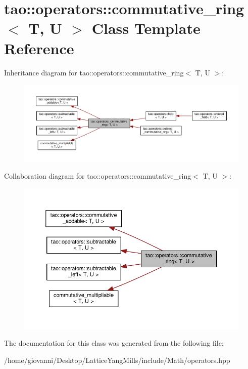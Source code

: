 \hypertarget{classtao_1_1operators_1_1commutative__ring}{}\section{tao\+:\+:operators\+:\+:commutative\+\_\+ring$<$ T, U $>$ Class Template Reference}
\label{classtao_1_1operators_1_1commutative__ring}


Inheritance diagram for tao\+:\+:operators\+:\+:commutative\+\_\+ring$<$ T, U $>$\+:\nopagebreak
\begin{figure}[H]
\begin{center}
\leavevmode
\includegraphics[width=350pt]{classtao_1_1operators_1_1commutative__ring__inherit__graph}
\end{center}
\end{figure}


Collaboration diagram for tao\+:\+:operators\+:\+:commutative\+\_\+ring$<$ T, U $>$\+:\nopagebreak
\begin{figure}[H]
\begin{center}
\leavevmode
\includegraphics[width=350pt]{classtao_1_1operators_1_1commutative__ring__coll__graph}
\end{center}
\end{figure}


The documentation for this class was generated from the following file\+:\begin{DoxyCompactItemize}
\item 
/home/giovanni/\+Desktop/\+Lattice\+Yang\+Mills/include/\+Math/operators.\+hpp\end{DoxyCompactItemize}
